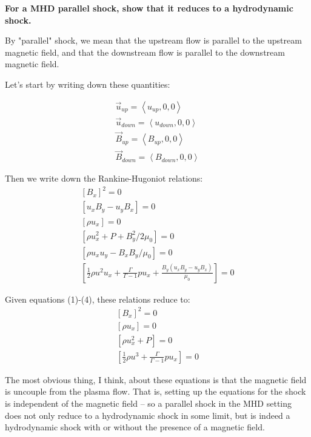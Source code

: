 \textbf{For a MHD parallel shock, show that it reduces to a hydrodynamic
shock.}

By "parallel" shock, we mean that the upstream flow is parallel to the
upstream magnetic field, and that the downstream flow is parallel to the
downstream magnetic field.

Let's start by writing down these quantities:
\begin{center}
  \begin{align}
    \vec{u}_{up} = \left< u_{up}, 0, 0 \right> \\
    \vec{u}_{down} = \left< u_{down}, 0, 0 \right>\\
    \vec{B}_{up} = \left< B_{up}, 0, 0 \right>\\ 
    \vec{B}_{down} = \left< B_{down}, 0, 0 \right> 
  \end{align}
\end{center}

Then we write down the Rankine-Hugoniot relations:
\begin{align}
  \left[ B_{x}\right]^{2} = 0 \\
  \left[ u_{x}B_{y} - u_{y}B_{x}\right] = 0 \\
  \left[ \rho u_{x}\right] = 0 \\
  \left[ \rho u_{x}^{2}+P+B_{y}^{2}/2\mu_{0}\right] = 0 \\
  \left[ \rho u_{x}u_{y}-B_{x}B_{y}/\mu_{0}\right] = 0 \\
  \left[ \frac{1}{2}\rho
  u^{2}u_{x}+\frac{\Gamma}{\Gamma-1}pu_{x}+\frac{ B_{y}(
  u_{x}B_{y}-u_{y}B_{x} )}{\mu_{0}}\right] = 0
\end{align}

Given equations (1)-(4), these relations reduce to:
\begin{align}
  \left[ B_{x}\right]^{2} = 0 \\
  \left[ \rho u_{x}\right] = 0 \\
  \left[ \rho u_{x}^{2}+P \right] = 0 \\
  \left[ \frac{1}{2}\rho
  u^{3}+\frac{\Gamma}{\Gamma-1}pu_{x}\right] = 0
\end{align}

The most obvious thing, I think, about these equations is that the
magnetic field is uncouple from the plasma flow. That is, setting up the
equations for the shock is independent of the magnetic field -- so a
parallel shock in the MHD setting does not only reduce to a hydrodynamic
shock in some limit, but is indeed a hydrodynamic shock with or without
the presence of a magnetic field.
